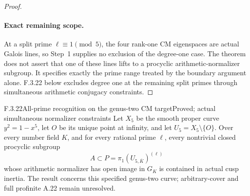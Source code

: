 \begin{proof}
\paragraph{Exact remaining scope.}
At a split prime $\ell\equiv1\pmod5$, the four rank-one
CM eigenspaces are actual Galois lines, so Step~1 supplies
no exclusion of the degree-one case. The theorem does not
assert that one of these lines lifts to a procyclic
arithmetic-normalizer subgroup. It specifies exactly the
prime range treated by the boundary argument alone. F.3.22
below excludes degree one at the remaining split primes
through simultaneous arithmetic conjugacy constraints.
\end{proof}

\begin{result}{F.3.22}{All-prime recognition on the genus-two CM target}{Proved; actual simultaneous normalizer constraints}
Let $X_5$ be the smooth proper curve $y^2=1-x^5$, let $O$ be its
unique point at infinity, and let $U_5=X_5\setminus\{O\}$.
Over every number field $K$, and for every rational prime $\ell$,
every nontrivial closed procyclic subgroup
\[
 A\subset P=\pi_1(U_{5,\overline K})^{(\ell)}
\]
whose arithmetic normalizer has open image in $G_K$ is contained
in actual cusp inertia. The result concerns this specified
genus-two curve; arbitrary-cover and full profinite A.22 remain
unresolved.
\end{result}
